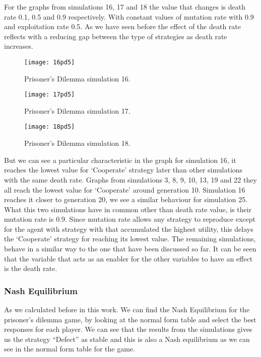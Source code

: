 \documentclass{book}
\begin{document}
For the graphs from simulations 16, 17 and 18 the value that changes is death rate 0.1, 0.5 and 0.9 respectively. With constant values of mutation rate with 0.9 and exploitation rate 0.5. As we have seen before the effect of the death rate reflects with a reducing gap between the type of strategies as death rate increases. 
 

\begin{figure}[H]
\begin{center}
	\texttt{[image: 16pd5]}
	
\caption{ Prisoner's Dilemma simulation 16.}
\label{fig:pds16}	
\end{center}
\end{figure}

\begin{figure}[H]
\begin{center}
	\texttt{[image: 17pd5]}
	
\caption{ Prisoner's Dilemma simulation 17.}
\label{fig:pds17}	
\end{center}
\end{figure}

\begin{figure}[H]
\begin{center}
	\texttt{[image: 18pd5]}

\caption{ Prisoner's Dilemma simulation 18.}
\label{fig:pds18}	
\end{center}
\end{figure}

But we can see a particular characteristic in the graph for simulation 16, it reaches the lowest value for `Cooperate' strategy later than other simulations with the same death rate. Graphs from simulations 3, 8, 9, 10, 13, 19 and 22 they all reach the lowest value for `Cooperate' around generation 10. Simulation 16 reaches it closer to generation 20, we see a similar behaviour for simulation 25. What this two simulations have in common other than death rate value, is their mutation rate is 0.9. Since mutation rate allows any strategy to reproduce except for the agent with strategy with that accumulated the highest utility, this delays the `Cooperate' strategy for reaching its lowest value.		  
The remaining simulations, behave in a similar way to the one that have been discussed  so far. It can be seen that the variable that acts as an enabler for the other variables to have an effect is the death rate. 

\subsubsection{Nash Equilibrium}
As we calculated before in this work. We can find the Nash Equilibrium for the prisoner's dilemma game, by looking at the normal form table and select the best responses for each player. We can see that the results from the simulations gives us the strategy ``Defect'' as stable and this is also a Nash equilibrium as we can see in the normal form table for the game.
\end{document}
